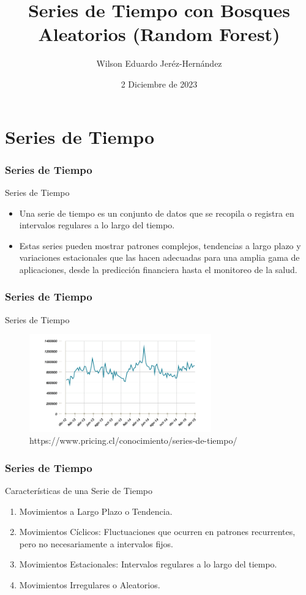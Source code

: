 \documentclass{beamer}
\title{Series de Tiempo con Bosques Aleatorios (Random Forest)}
\author[iprea@udistrital.edu.co]{Wilson Eduardo Jeréz-Hernández}
\date{2 Diciembre de 2023}
\begin{document}
\frame{\titlepage}

\section{Series de Tiempo}

\begin{frame}
  \frametitle{Series de Tiempo}
  \begin{block}{Series de Tiempo}
  \begin{itemize}
      \item Una serie de tiempo es un conjunto de datos que se recopila o registra en intervalos regulares a lo largo del tiempo.
      \item Estas series pueden mostrar patrones complejos, tendencias a largo plazo y variaciones estacionales que las hacen adecuadas para una amplia gama de aplicaciones, desde la predicción financiera hasta el monitoreo de la salud.
  \end{itemize}
  \end{block}
\end{frame}
\begin{frame}
    \frametitle{Series de Tiempo}
      \begin{block}{Series de Tiempo}

	\begin{figure}
		\includegraphics[width=0.7\textwidth]{grafico_ventas.png}
		\caption{https://www.pricing.cl/conocimiento/series-de-tiempo/}
	\end{figure}

  \end{block}
\end{frame}

\begin{frame}
\frametitle{Series de Tiempo}
\begin{block}{Características de una Serie de Tiempo}
\begin{enumerate}
    \item Movimientos a Largo Plazo o Tendencia.
    \item Movimientos Cíclicos: Fluctuaciones que ocurren en patrones recurrentes, pero no necesariamente a intervalos fijos.
    \item Movimientos Estacionales: Intervalos regulares a lo largo del tiempo.
    \item Movimientos Irregulares o Aleatorios.
\end{enumerate}
\end{block}

\end{frame}
\end{document}

